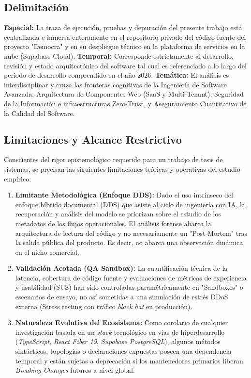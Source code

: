 \documentclass[11pt,a4paper,oneside]{report}
\begin{document}
\subsection{Delimitaci\'on}
\textbf{Espacial:} La traza de ejecuci\'on, pruebas y depuraci\'on del presente trabajo est\'a centralizada e inmersa enteramente en el repositorio privado del c\'odigo fuente del proyecto "Democra" y en su despliegue t\'ecnico en la plataforma de servicios en la nube (Supabase Cloud). \textbf{Temporal:} Corresponde estrictamente al desarrollo, revisi\'on y estado arquitect\'onico del software tal cual es referenciado a lo largo del periodo de desarrollo comprendido en el a\~no 2026. \textbf{Tem\'atica:} El an\'alisis es interdisciplinar y cruza las fronteras cognitivas de la Ingenier\'ia de Software Avanzada, Arquitectura de Componentes Web (SaaS y Multi-Tenant), Seguridad de la Informaci\'on e infraestructuras Zero-Trust, y Aseguramiento Cuantitativo de la Calidad del Software.

\subsection{Limitaciones y Alcance Restrictivo}
Conscientes del rigor epistemol\'ogico requerido para un trabajo de tesis de sistemas, se precisan las siguientes limitaciones te\'oricas y operativas del estudio emp\'irico:
\begin{enumerate}
    \item \textbf{Limitante Metodol\'ogica (Enfoque DDS):} Dado el uso intr\'inseco del enfoque h\'ibrido documental (DDS) que asiste al ciclo de ingenier\'ia con IA, la recuperaci\'on y an\'alisis del modelo se priorizan sobre el estudio de los metadatos de los flujos operacionales. El an\'alisis forense abarca la arquitectura de lectura del c\'odigo y no necesariamente un "Post-Mortem" tras la salida p\'ublica del producto. Es decir, no abarca una observaci\'on din\'amica en el nicho comercial.
    \item \textbf{Validaci\'on Acotada (QA Sandbox):} La cuantificaci\'on t\'ecnica de la latencia, cobertura de c\'odigo fuente y evaluaciones de m\'etricas de experiencia y usabilidad (SUS) han sido controladas param\'etricamente en "Sandboxes" o escenarios de ensayo, no as\'i sometidas a una simulaci\'on de estr\'es DDoS externa (Stress testing con tr\'afico \textit{black hat} en producci\'on).
    \item \textbf{Naturaleza Evolutiva del Ecosistema:} Como corolario de cualquier investigaci\'on basada en un \textit{stack} tecnol\'ogico en v\'ias de hiperdesarrollo (\textit{TypeScript}, \textit{React Fiber 19}, \textit{Supabase PostgreSQL}), algunos m\'etodos sint\'acticos, topolog\'ias o declaraciones expuestas poseen una dependencia temporal y est\'an sujetas a deprecaci\'on si los mantenedores primarios liberan \textit{Breaking Changes} futuros a nivel global.
\end{enumerate}
\end{document}

